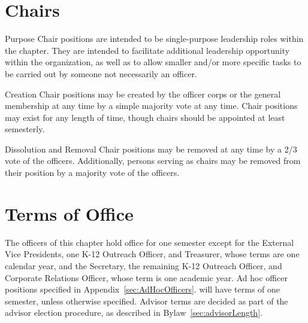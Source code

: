 \section{Chairs}
\begin{enumsubsection}
\item{Purpose} Chair positions are intended to be single-purpose leadership roles within the chapter. They are intended to facilitate additional leadership opportunity within the organization, as well as to allow smaller and/or more specific tasks to be carried out by someone not necessarily an officer.
\item{Creation} Chair positions may be created by the officer corps or the general membership at any time by a simple majority vote at any time. Chair positions may exist for any length of time, though chairs should be appointed at least semesterly.
\item{Dissolution and Removal} Chair positions may be removed at any time by a 2/3 vote of the officers. Additionally, persons serving as chairs may be removed from their position by a majority vote of the officers.
\end{enumsubsection}

\section{Terms of Office} The officers of this chapter hold office for one semester except for the External Vice Presidents, 
one K-12 Outreach Officer, and Treasurer, whose terms are one calendar year, and the Secretary, the remaining K-12 Outreach 
Officer, and Corporate Relations Officer, whose term is one academic year. Ad hoc officer positions specified in Appendix~\ref{sec:AdHocOfficers}. will have terms of one semester, unless otherwise specified. Advisor terms are decided as part of the advisor election procedure, as described in Bylaw~\ref{sec:advisorLength}.

